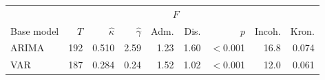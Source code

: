 \centering\small
\begin{tabular}{lrrrrrrrr}
\hline
 & & & & \multicolumn{2}{c}{$F$} & & & \\
Base model & $T$ & $\widehat\kappa$ & $\widehat\gamma$ & Adm. & Dis. & $p$ & Incoh. & Kron. \\
\hline
ARIMA & 192 & 0.510 & 2.59 & 1.23 & 1.60 & $<$0.001 & 16.8 & 0.074 \\
VAR & 187 & 0.284 & 0.24 & 1.52 & 1.02 & $<$0.001 & 12.0 & 0.061 \\
\hline
\end{tabular}
